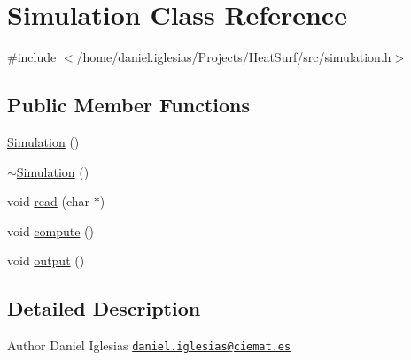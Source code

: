 \hypertarget{classSimulation}{\section{Simulation Class Reference}
\label{classSimulation}
}


{\ttfamily \#include $<$/home/daniel.\-iglesias/\-Projects/\-Heat\-Surf/src/simulation.\-h$>$}

\subsection*{Public Member Functions}
\begin{DoxyCompactItemize}
\item 
\hyperlink{classSimulation_a5b224cc5b36bcc8eb29689aff223de41}{Simulation} ()
\item 
\hyperlink{classSimulation_a80fad3f57dfaf195a36f7bc49bc88279}{$\sim$\-Simulation} ()
\item 
void \hyperlink{classSimulation_a7da40348e01c14777853a5f9e3f4d0e9}{read} (char $\ast$)
\item 
void \hyperlink{classSimulation_add5f5f74f34dc0a7e1fe2578f071fb07}{compute} ()
\item 
void \hyperlink{classSimulation_ad1f0c2b7ad3b17c6bd4899624716ed88}{output} ()
\end{DoxyCompactItemize}


\subsection{Detailed Description}
\begin{DoxyAuthor}{Author}
Daniel Iglesias \href{mailto:daniel.iglesias@ciemat.es}{\tt daniel.\-iglesias@ciemat.\-es} 
\end{DoxyAuthor}


